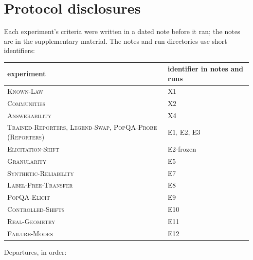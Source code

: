 \documentclass[11pt]{article}
\theoremstyle{definition}
\theoremstyle{remark}
\newcommand{\1}{\mathbf{1}}
\newcommand{\expname}[1]{\textsc{#1}}
\begin{document}
\appendix
\section{Protocol disclosures}
\label{app:protocol}
Each experiment's criteria were written in a dated note before it ran; the notes are in the
supplementary material. The notes and run directories use short identifiers:
\begin{center}\small
\begin{tabular}{ll}
\toprule
experiment & identifier in notes and runs\\
\midrule
\expname{Known-Law} & X1\\
\expname{Communities} & X2\\
\expname{Answerability} & X4\\
\expname{Trained-Reporters}, \expname{Legend-Swap}, \expname{PopQA-Probe} (\expname{Reporters}) & E1, E2, E3\\
\expname{Elicitation-Shift} & E2-frozen\\
\expname{Granularity} & E5\\
\expname{Synthetic-Reliability} & E7\\
\expname{Label-Free-Transfer} & E8\\
\expname{PopQA-Elicit} & E9\\
\expname{Controlled-Shifts} & E10\\
\expname{Real-Geometry} & E11\\
\expname{Failure-Modes} & E12\\
\bottomrule
\end{tabular}
\end{center} Departures, in order:
\end{document}
